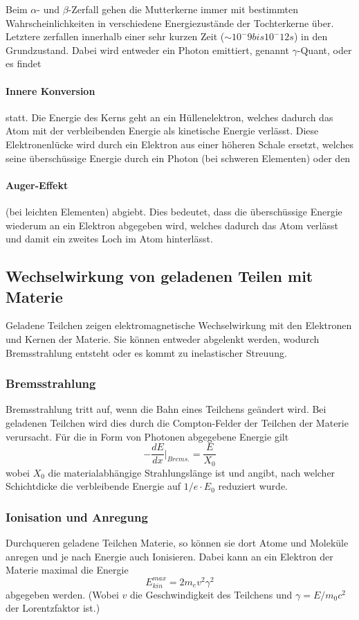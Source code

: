 Beim $\alpha$- und $\beta$-Zerfall gehen die Mutterkerne immer mit bestimmten Wahrscheinlichkeiten in verschiedene Energiezustände der Tochterkerne über. Letztere zerfallen innerhalb einer sehr kurzen Zeit ($\sim 10^-9 bis 10^-12 s$) in den Grundzustand. Dabei wird entweder ein Photon emittiert, genannt $\gamma$-Quant, oder es findet \paragraph{Innere Konversion} statt. Die Energie des Kerns geht an ein Hüllenelektron, welches dadurch das Atom mit der verbleibenden Energie als kinetische Energie verlässt. Diese Elektronenlücke wird durch ein Elektron aus einer höheren Schale ersetzt, welches seine überschüssige Energie durch ein Photon (bei schweren Elementen) oder den \paragraph{Auger-Effekt} (bei leichten Elementen) abgiebt.
Dies bedeutet, dass die überschüssige Energie wiederum an ein Elektron abgegeben wird, welches dadurch das Atom verlässt und damit ein zweites Loch im Atom hinterlässt.

\subsection{Wechselwirkung von geladenen Teilen mit Materie}

Geladene Teilchen zeigen elektromagnetische Wechselwirkung mit den Elektronen und Kernen der Materie. Sie können entweder abgelenkt werden, wodurch Bremsstrahlung entsteht oder es kommt zu inelastischer Streuung.

\subsubsection{Bremsstrahlung}
Bremsstrahlung tritt auf, wenn die Bahn eines Teilchens geändert wird. Bei geladenen Teilchen wird dies durch die Compton-Felder der Teilchen der Materie verursacht. Für die in Form von Photonen abgegebene Energie gilt
\begin{equation}
 - \frac{dE}{dx} \rvert_{Brems.} = \frac{E}{X_0}
\end{equation}
wobei $X_0$ die materialabhängige Strahlungslänge ist und angibt, nach welcher Schichtdicke die verbleibende Energie auf $1/e \cdot E_0$ reduziert wurde.

\subsubsection{Ionisation und Anregung}
Durchqueren geladene Teilchen Materie, so können sie dort Atome und Moleküle anregen und je nach Energie auch Ionisieren. Dabei kann an ein Elektron der Materie maximal die Energie
\begin{equation}
 E_{kin}^{max} = 2 m_e v^2 \gamma^2
\end{equation}
abgegeben werden. (Wobei $v$ die Geschwindigkeit des Teilchens und $\gamma = E / m_0 c^2$ der Lorentzfaktor ist.)

